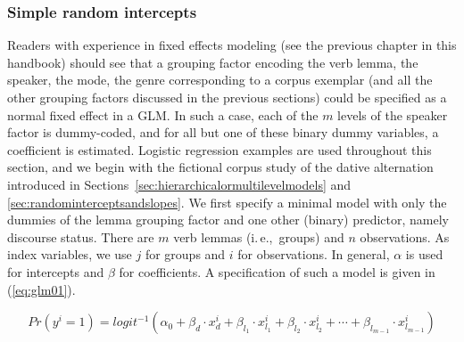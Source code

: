 \documentclass[a4paper,12pt]{article}
\newcommand{\ie}{i.\,e.,\ }
\begin{document}
\subsubsection{Simple random intercepts}
\label{sec:simplerandomintercepts}

Readers with experience in fixed effects modeling (see the previous chapter in this handbook) should see that a grouping factor encoding the verb lemma, the speaker, the mode, the genre corresponding to a corpus exemplar (and all the other grouping factors discussed in the previous sections) could be specified as a normal fixed effect in a GLM.
In such a case, each of the $m$ levels of the speaker factor is dummy-coded, and for all but one of these binary dummy variables, a coefficient is estimated.
Logistic regression examples are used throughout this section, and we begin with the fictional corpus study of the dative alternation introduced in Sections~\ref{sec:hierarchicalormultilevelmodels} and \ref{sec:randominterceptsandslopes}.
We first specify a minimal model with only the dummies of the lemma grouping factor and one other (binary) predictor, namely discourse status.
There are $m$ verb lemmas (\ie groups) and $n$ observations.
As index variables, we use $j$ for groups and $i$ for observations.
In general, $\alpha$ is used for intercepts and $\beta$ for coefficients.
A specification of such a model is given in (\ref{eq:glm01}).

\begin{equation}
  Pr(y^i=1)=logit^{-1}(\alpha_0+\beta_d\cdot x_{d}^i+\beta_{l_1}\cdot x_{l_1}^i+\beta_{l_2}\cdot x_{l_2}^i+\cdots+\beta_{l_{m-1}}\cdot x_{l_{m-1}}^i)
  \label{eq:glm01}
\end{equation}
\end{document}
